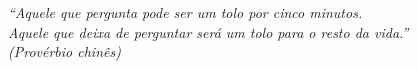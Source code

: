 \begin{epigrafe}
    \vspace*{\fill}
	\begin{flushright}
		\textit{``Aquele que pergunta pode ser um tolo por cinco minutos.\\
		Aquele que deixa de perguntar será um tolo para o resto da vida.''\\
		(Provérbio chinês)}
	\end{flushright}
\end{epigrafe}
